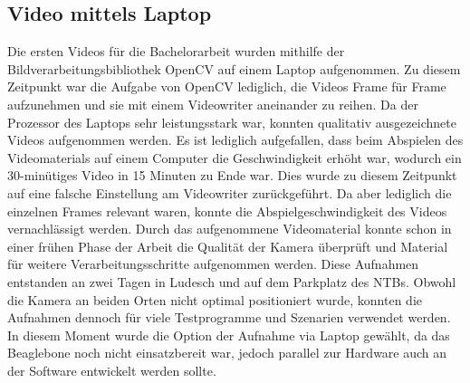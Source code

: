 \subsection{Video mittels Laptop}
Die ersten Videos für die Bachelorarbeit wurden mithilfe der Bildverarbeitungsbibliothek OpenCV auf einem Laptop aufgenommen. Zu diesem Zeitpunkt war die Aufgabe von OpenCV lediglich, die Videos Frame für Frame aufzunehmen und sie mit einem Videowriter aneinander zu reihen. Da der Prozessor des Laptops sehr leistungsstark war, konnten qualitativ ausgezeichnete Videos aufgenommen werden. Es ist lediglich aufgefallen, dass beim Abspielen des Videomaterials auf einem Computer die Geschwindigkeit erhöht war, wodurch ein 30-minütiges Video in 15 Minuten zu Ende war. Dies wurde zu diesem Zeitpunkt auf eine falsche Einstellung am Videowriter zurückgeführt. Da aber lediglich die einzelnen Frames relevant waren, konnte die Abspielgeschwindigkeit des Videos vernachlässigt werden. Durch das aufgenommene Videomaterial konnte schon in einer frühen Phase der Arbeit die Qualität der Kamera überprüft und Material für weitere Verarbeitungsschritte aufgenommen werden. Diese Aufnahmen entstanden an zwei Tagen in Ludesch und auf dem Parkplatz des NTBs. Obwohl die Kamera an beiden Orten nicht optimal positioniert wurde, konnten die Aufnahmen dennoch für viele Testprogramme und Szenarien verwendet werden. In diesem Moment wurde die Option der Aufnahme via Laptop gewählt, da das Beaglebone noch nicht einsatzbereit war, jedoch parallel zur Hardware auch an der Software entwickelt werden sollte.